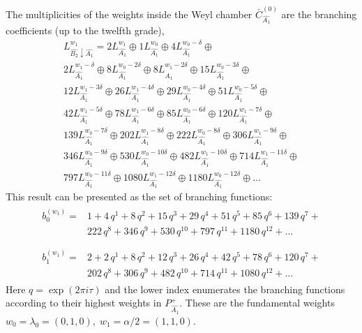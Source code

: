 \documentclass[12pt]{iopart}
\theoremstyle{definition}
\theoremstyle{definition}
\theoremstyle{definition}
\theoremstyle{definition}
\begin{document}
The multiplicities of the weights inside the  Weyl chamber
$\bar{C}^{\left( 0 \right)}_{\hat{A_1}}$
are the branching coefficients (up to the twelfth grade),
\begin{eqnarray*}
  \label{eq:28}
  L^{w_1}_{\hat{B_2}\downarrow \hat{A_1}}=2 L_{\hat{A_1}}^{w_1}\oplus 1 L_{\hat{A_1}}^{w_0}\oplus 4 L_{\hat{A_1}}^{w_0-\delta}\oplus\\
    2 L_{\hat{A_1}}^{w_1-\delta}\oplus 8 L_{\hat{A_1}}^{w_0-2\delta}\oplus
    8 L_{\hat{A_1}}^{w_1-2\delta}\oplus 15 L_{\hat{A_1}}^{w_0-3\delta}\oplus\\
    12 L_{\hat{A_1}}^{w_1-3\delta}\oplus 26 L_{\hat{A_1}}^{w_1-4\delta}\oplus
    29 L_{\hat{A_1}}^{w_0-4\delta}\oplus 51 L_{\hat{A_1}}^{w_0-5\delta}\oplus\\
    42 L_{\hat{A_1}}^{w_1-5\delta}\oplus 78 L_{\hat{A_1}}^{w_1-6\delta}\oplus
    85 L_{\hat{A_1}}^{w_0-6\delta}\oplus 120 L_{\hat{A_1}}^{w_1-7\delta}\oplus\\
    139 L_{\hat{A_1}}^{w_0-7\delta}\oplus 202 L_{\hat{A_1}}^{w_1-8\delta}\oplus
    222 L_{\hat{A_1}}^{w_0-8\delta}\oplus 306 L_{\hat{A_1}}^{w_1-9\delta}\oplus\\
    346 L_{\hat{A_1}}^{w_0-9\delta}\oplus 530 L_{\hat{A_1}}^{w_0-10\delta}\oplus
    482 L_{\hat{A_1}}^{w_1-10\delta}\oplus 714 L_{\hat{A_1}}^{w_1-11\delta}\oplus\\
    797 L_{\hat{A_1}}^{w_0-11\delta}\oplus 1080 L_{\hat{A_1}}^{w_1-12\delta}\oplus
    1180 L_{\hat{A_1}}^{w_0-12\delta}\oplus \dots
\end{eqnarray*}
This result can be presented as the set of branching functions:
\begin{eqnarray*}
  \label{eq:29}
  \begin{array}{cc}
    b^{(w_1)}_{0}= & 1 + 4\,q^{1}+ 8\,q^{2}+ 15\,q^{3}+ 29\,q^{4}+ 51\,q^{5}+ 85\,q^{6}+ 139\,q^{7}+\\
     &222\,q^{8}+ 346\,q^{9}+ 530\,q^{10}+ 797\,q^{11}+ 1180\,q^{12}+\dots\\
  \end{array}\\
  \begin{array}{cc}
    b^{(w_1)}_{1}= &2+2\,q^{1}+8\,q^{2}+12\,q^{3}+26\,q^{4}+42\,q^{5}+78\,q^{6}+120\,q^{7}+\\
    & 202\,q^{8}+306\,q^{9}+482\,q^{10}+714\,q^{11}+1080\,q^{12}+\dots
  \end{array}
\end{eqnarray*}
Here $q=\exp (2\pi i \tau)$ and the lower index enumerates the branching functions according
to their highest weights in $P^+_{\hat{A_1}}$.
These are the fundamental weights $w_0=\lambda_0=(0,1,0),\; w_1=\alpha/2=(1,1,0)$.
\end{document}

